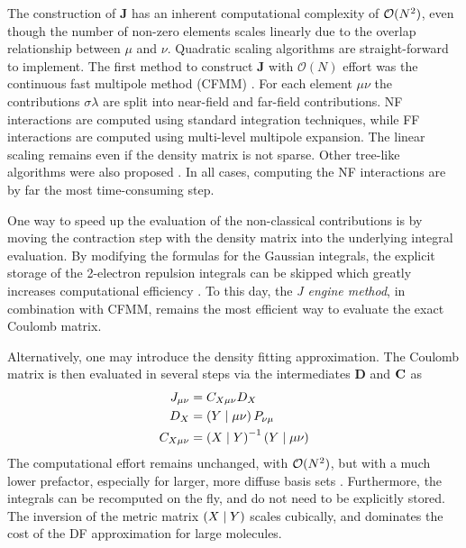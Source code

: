 \begin{center}
\end{center}

\noindent The construction of $\mathbf{J}$ has an inherent computational complexity of $\mathcal{O}(N^{2})$, even though the number of non-zero elements scales linearly due to the overlap relationship between $\mu$ and $\nu$. Quadratic scaling algorithms are straight-forward to implement. The first method to construct $\mathbf{J}$ with $\mathcal{O}(N)$ effort was the continuous fast multipole method (CFMM) \cite{Whi1996}. For each element $\mu\nu$ the contributions $\sigma\lambda$ are split into near-field and far-field contributions. NF interactions are computed using standard integration techniques, while FF interactions are computed using multi-level multipole expansion. The linear scaling remains even if the density matrix is not sparse. Other tree-like algorithms were also proposed \cite{Str1996,Cha1996}. In all cases, computing the NF interactions are by far the most time-consuming step.

One way to speed up the evaluation of the non-classical contributions is by moving the contraction step with the density matrix into the underlying integral evaluation. By modifying the formulas for the Gaussian integrals, the explicit storage of the 2-electron repulsion integrals can be skipped which greatly increases computational efficiency \cite{Whi1996,Sha2000,Sha2001}. To this day, the \emph{J engine method}, in combination with CFMM, remains the most efficient way to evaluate the exact Coulomb matrix.

Alternatively, one may introduce the density fitting approximation. The Coulomb matrix is then evaluated in several steps via the intermediates $\mathbf{D}$ and $\mathbf{C}$ as 
\begin{align}
J_{\mu\nu} &= C_{X\mu\nu} D_X \\
D_X &= \left( Y \mid \mu\nu \right) P_{\nu\mu} \\
C_{X\mu\nu} &= \left( X \mid Y \right)^{-1} \left( Y \mid \mu\nu \right)
\end{align}
\noindent The computational effort remains unchanged, with $\mathcal{O}(N^{2})$, but with a much lower prefactor, especially for larger, more diffuse basis sets \cite{Wei2002}. Furthermore, the integrals can be recomputed on the fly, and do not need to be explicitly stored. The inversion of the metric matrix $\left( X \mid Y \right)$ scales cubically, and dominates the cost of the DF approximation for large molecules. 

